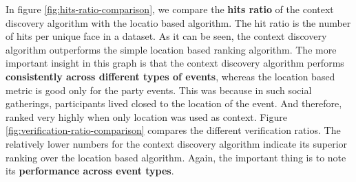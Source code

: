 In figure \ref{fig:hits-ratio-comparison}, we compare the \textbf{hits ratio} of the context discovery algorithm with the locatio based algorithm. The hit ratio is the number of hits per unique face in a dataset. As it can be seen, the context discovery algorithm outperforms the simple location based ranking algorithm. The more important insight in this graph is that the context discovery algorithm performs \textbf{consistently across different types of events}, whereas the location based metric is good only for the party events. This was because in such social gatherings, participants lived closed to the location of the event. And therefore, ranked very highly when only location was used as context. Figure \ref{fig:verification-ratio-comparison} compares the different verification ratios. The relatively lower numbers for the context discovery algorithm indicate its superior ranking over the location based algorithm. Again, the important thing is to note its \textbf{performance across event types}. 

